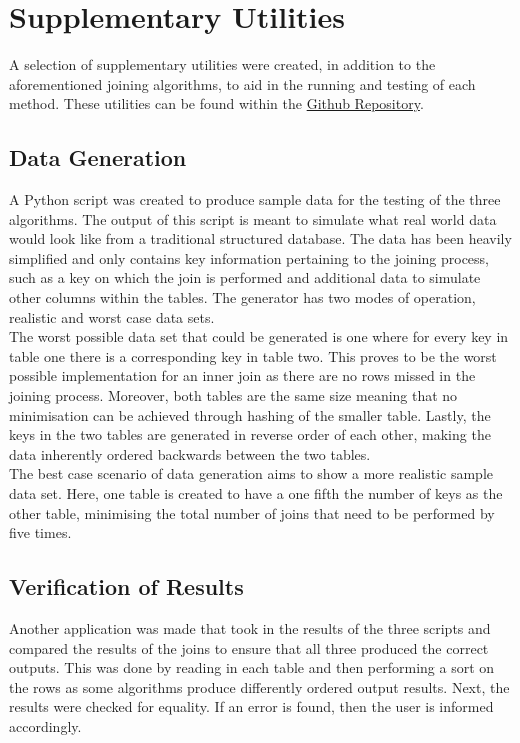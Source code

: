 \documentclass[10.5 pt, conference]{IEEEtran}
\begin{document}
\section{Supplementary Utilities}
A selection of supplementary utilities were created, in addition to the aforementioned joining algorithms, to aid in the running and testing of each method. These utilities can be found within the \href{https://github.com/data-intensive-computing-4020/Project}{Github Repository}.

\subsection{Data Generation}
A Python script was created to produce sample data for the testing of the three algorithms. The output of this script is meant to simulate what real world data would look like from a traditional structured database. The data has been heavily simplified and only contains key information pertaining to the joining process, such as a key on which the join is performed and additional data to simulate other columns within the tables. The generator has two modes of operation,  realistic and worst case data sets.\\

The worst possible data set that could be generated is one where for every key in table one there is a corresponding key in table two. This proves to be the worst possible implementation for an inner join as there are no rows missed in the joining process. Moreover, both tables are the same size meaning that no minimisation can be achieved through hashing of the smaller table. Lastly, the keys in the two tables are generated in reverse order of each other, making the data inherently ordered backwards between the two tables.\\

The best case scenario of data generation aims to show a more realistic sample data set. Here, one table is created to have a one fifth the number of keys as the other table, minimising the total number of joins that need to be performed by five times.

\subsection{Verification of Results}
Another application was made that took in the results of the three scripts and compared the results of the joins to ensure that all three produced the correct outputs. This was done by reading in each table and then performing a sort on the rows as some algorithms produce differently ordered output results. Next, the results were checked for equality. If an error is found, then the user is informed accordingly. 
\end{document}
